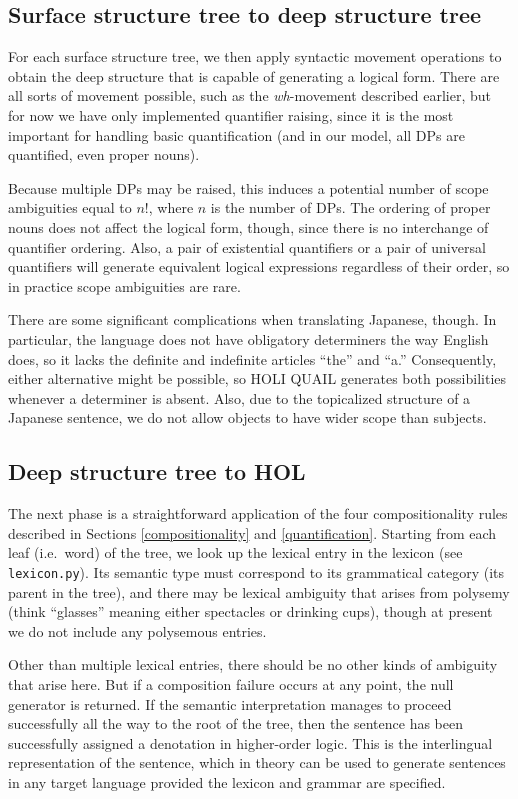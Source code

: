 \documentclass[11pt, oneside]{article}      %
\begin{document}
\subsection{Surface structure tree to deep structure tree}

For each surface structure tree, we then apply syntactic movement operations to obtain the deep structure that is capable of generating a logical form.  There are all sorts of movement possible, such as the \textit{wh}-movement described earlier, but for now we have only implemented quantifier raising, since it is the most important for handling basic quantification (and in our model, all DPs are quantified, even proper nouns).

Because multiple DPs may be raised, this induces a potential number of scope ambiguities equal to $n!$, where $n$ is the number of DPs.  The ordering of proper nouns does not affect the logical form, though, since there is no interchange of quantifier ordering.  Also, a pair of existential quantifiers or a pair of universal quantifiers will generate equivalent logical expressions regardless of their order, so in practice scope ambiguities are rare.

There are some significant complications when translating Japanese, though.  In particular, the language does not have obligatory determiners the way English does, so it lacks the definite and indefinite articles ``the'' and ``a.''  Consequently, either alternative might be possible, so HOLI QUAIL generates both possibilities whenever a determiner is absent.  Also, due to the topicalized structure of a Japanese sentence, we do not allow objects to have wider scope than subjects.

\subsection{Deep structure tree to HOL}

The next phase is a straightforward application of the four compositionality rules described in Sections \ref{compositionality} and \ref{quantification}.  Starting from each leaf (i.e.\ word) of the tree, we look up the lexical entry in the lexicon (see \texttt{lexicon.py}).  Its semantic type must correspond to its grammatical category (its parent in the tree), and there may be lexical ambiguity that arises from polysemy (think ``glasses'' meaning either spectacles or drinking cups), though at present we do not include any polysemous entries.

Other than multiple lexical entries, there should be no other kinds of ambiguity that arise here.  But if a composition failure occurs at any point, the null generator is returned.  If the semantic interpretation manages to proceed successfully all the way to the root of the tree, then the sentence has been successfully assigned a denotation in higher-order logic.  This is the interlingual representation of the sentence, which in theory can be used to generate sentences in any target language provided the lexicon and grammar are specified.
\end{document}
